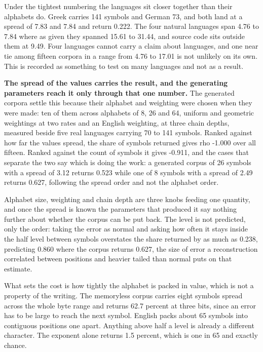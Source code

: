 Under the tightest numbering the languages sit closer together than their alphabets do. Greek carries 141 symbols and German 73, and both land at a spread of 7.83 and 7.84 and return 0.222. The four natural languages span 4.76 to 7.84 where as given they spanned 15.61 to 31.44, and source code sits outside them at 9.49. Four languages cannot carry a claim about languages, and one near tie among fifteen corpora in a range from 4.76 to 17.01 is not unlikely on its own. This is recorded as something to test on many languages and not as a result.

\textbf{The spread of the values carries the result, and the generating parameters reach it only through that one number.} The generated corpora settle this because their alphabet and weighting were chosen when they were made: ten of them across alphabets of 8, 26 and 64, uniform and geometric weightings at two rates and an English weighting, at three chain depths, measured beside five real languages carrying 70 to 141 symbols. Ranked against how far the values spread, the share of symbols returned gives rho -1.000 over all fifteen. Ranked against the count of symbols it gives -0.911, and the cases that separate the two say which is doing the work: a generated corpus of 26 symbols with a spread of 3.12 returns 0.523 while one of 8 symbols with a spread of 2.49 returns 0.627, following the spread order and not the alphabet order.

Alphabet size, weighting and chain depth are three knobs feeding one quantity, and once the spread is known the parameters that produced it say nothing further about whether the corpus can be put back. The level is not predicted, only the order: taking the error as normal and asking how often it stays inside the half level between symbols overstates the share returned by as much as 0.238, predicting 0.860 where the corpus returns 0.627, the size of error a reconstruction correlated between positions and heavier tailed than normal puts on that estimate.

What sets the cost is how tightly the alphabet is packed in value, which is not a property of the writing. The memoryless corpus carries eight symbols spread across the whole byte range and returns 62.7 percent at three bits, since an error has to be large to reach the next symbol. English packs about 65 symbols into contiguous positions one apart. Anything above half a level is already a different character. The exponent alone returns 1.5 percent, which is one in 65 and exactly chance.

